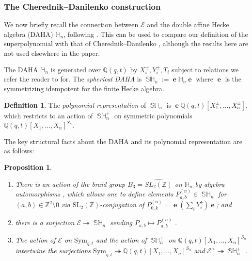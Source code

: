 \documentclass{amsart}
\numberwithin{equation}{section}
\newtheorem{proposition}[lemma]{Proposition}%
\theoremstyle{definition}
\newtheorem{definition}[lemma]{Definition}%
\def\16{{\bf 16}}
\def\1{{\bf 1}}
\def\SL{{\mathrm{SL}}}
\def\Sym{{\mathrm{Sym}}}
\DeclareMathOperator{\SH}{\mathbb{SH}}
\DeclareMathOperator{\eee}{\mathbf{e}}
\newcommand{\frs}{\mathbf{f}_{\vec{p},\vec{q}}}
\newcommand{\cE}{\mathcal{E}}
\newcommand{\fv}{\mathfrak{v}}
\newcommand{\Z}{{\mathbb Z}}
\newcommand{\Q}{{\mathbb Q}}
\newcommand{\HH}{\mathbb{H}}
\begin{document}


\subsubsection*{The Cherednik--Danilenko construction}

We now briefly recall the connection between $\cE$ and the double affine Hecke algebra (DAHA) $\HH_n$, following \cite{SVCherednik, CD}. This can be used to compare our definition of the superpolynomial with that of Cherednik--Danilenko \cite{CD}, although the results here are not used elsewhere in the paper.

The DAHA $\HH_n$ is generated over $\Q(q,t)$ by $X_i^\pm, Y_i^\pm, T_i$ subject to relations we refer the reader to \cite[Section 1.3.]{CD} for. The {\em spherical DAHA} is $\SH_n:=\eee \HH_n \eee$ where $\eee$ is the symmetrizing idempotent for the finite Hecke algebra.
\begin{definition}
\label{def:polyrep}
The {\em polynomial representation} of $\SH_n$ is $\eee \Q(q,t)[X_1^\pm,\ldots,X_n^\pm]$, which restricts to an action of $\SH_n^+$ on symmetric polynomials $\Q(q,t)[X_1,\ldots,X_n]^{S_n}$.
\end{definition}
The key structural facts about the DAHA and its polynomial representation are as follows: 
\begin{proposition}
\label{prop:dahastruct}
\begin{enumerate}
\item There is an action of the braid group $B_3=\widehat{SL_2(\Z)}$ on $\HH_n$ by algebra automorphisms \cite[Section 1.3.]{CD}, which allows one to define elements $P^{(n)}_{a,b}\in \SH_n$ for $(a,b)\in\Z^2\setminus 0$ via 
$\SL_2(\Z)$-conjugation of $P^{(n)}_{0,k}=\eee(\sum_i Y_i^k)\eee$; and 
\item there is a surjection $\cE\twoheadrightarrow \SH_n$ sending $P_{a,b}\mapsto P^{(n)}_{a,b}$ \cite[Theorem 4.6.]{SVCherednik}.
\item The action of $\cE$ on $\Sym_{q,t}$ and the action of $\SH_n^+$ on $\Q(q,t)[X_1,\ldots,X_n]^{S_n}$ intertwine the surjections $\Sym_{q,t}\twoheadrightarrow \Q(q,t)[X_1,\ldots,X_n]^{S_n}$ and $\cE^>\twoheadrightarrow \SH_n^+$ \cite[Section 5.1]{SVCherednik}.
\end{enumerate}
\end{proposition}
\end{document}
